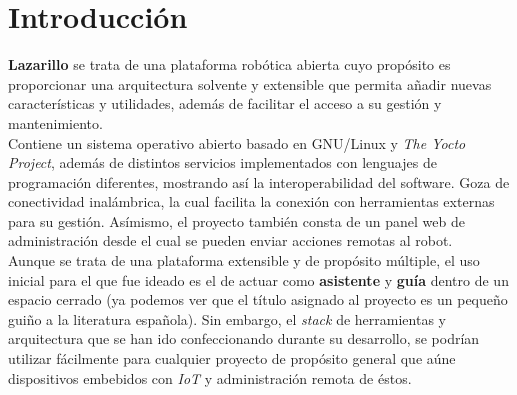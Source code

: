 \chapter{Introducción}

\textbf{Lazarillo} se trata de una plataforma robótica abierta cuyo propósito es proporcionar una arquitectura solvente y extensible que permita añadir nuevas características y utilidades, además de facilitar el acceso a su gestión y mantenimiento.\\

Contiene un sistema operativo abierto basado en GNU/Linux y \textit{The Yocto Project}, además de distintos servicios implementados con lenguajes de programación diferentes, mostrando así la interoperabilidad del software. Goza de conectividad inalámbrica, la cual facilita la conexión con herramientas externas para su gestión. Asímismo, el proyecto también consta de un panel web de administración desde el cual se pueden enviar acciones remotas al robot.\\

Aunque se trata de una plataforma extensible y de propósito múltiple, el uso inicial para el que fue ideado es el de actuar como \textbf{asistente} y \textbf{guía} dentro de un espacio cerrado (ya podemos ver que el título asignado al proyecto es un pequeño guiño a la literatura española). Sin embargo, el \textit{stack} de herramientas y arquitectura que se han ido confeccionando durante su desarrollo, se podrían utilizar fácilmente para cualquier proyecto de propósito general que aúne dispositivos embebidos con \textit{IoT} y administración remota de éstos.